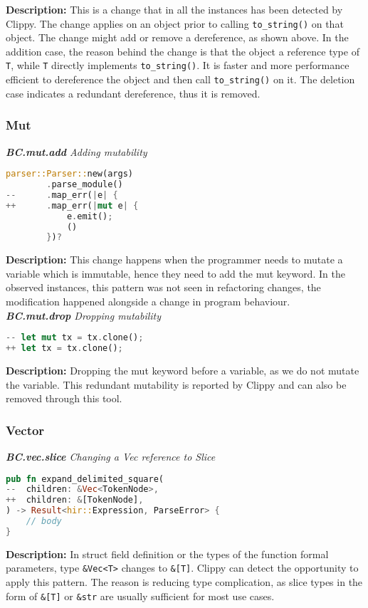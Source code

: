 \noindent\textbf{Description:} This is a change that in all the instances has been detected by Clippy. The change applies on an object prior to calling \verb+to_string()+ on that object. The change might add or remove a dereference, as shown above. In the addition case, the reason behind the change is that the object a reference type of \verb+T+, while \verb+T+ directly implements \verb+to_string()+. It is faster and more performance efficient to dereference the object and then call \verb+to_string()+ on it. The deletion case indicates a redundant dereference, thus it is removed.


\subsubsection{Mut}

\noindent\textit{\textbf{BC.mut.add} Adding mutability}

\begin{lstlisting}[language=Rust, style=colouredRust]
parser::Parser::new(args)
        .parse_module()
--      .map_err(|e| {
++      .map_err(|mut e| {
            e.emit();
            ()
        })?
\end{lstlisting}

\noindent\textbf{Description:} This change happens when the programmer needs to mutate a variable which is immutable, hence they need to add the mut keyword. In the observed instances, this pattern was not seen in refactoring changes, the modification happened alongside a change in program behaviour. \\

\noindent\textit{\textbf{BC.mut.drop} Dropping mutability}

\begin{lstlisting}[language=Rust, style=colouredRust]
-- let mut tx = tx.clone();
++ let tx = tx.clone();
\end{lstlisting}

\noindent\textbf{Description:} Dropping the mut keyword before a variable, as we do not mutate the variable. This redundant mutability is reported by Clippy and can also be removed through this tool.

\subsubsection{Vector}

\noindent\textit{\textbf{BC.vec.slice} Changing a Vec reference to Slice}

\begin{lstlisting}[language=Rust, style=colouredRust]
pub fn expand_delimited_square(
--  children: &Vec<TokenNode>,
++  children: &[TokenNode],
) -> Result<hir::Expression, ParseError> {
    // body
}
\end{lstlisting}
\noindent\textbf{Description:} In struct field definition or the types of the function formal parameters, type \verb+&Vec<T>+ changes to \verb+&[T]+. Clippy can detect the opportunity to apply this pattern. The reason is reducing type complication, as slice types in the form of \verb+&[T]+ or \verb+&str+ are usually sufficient for most use cases. 

